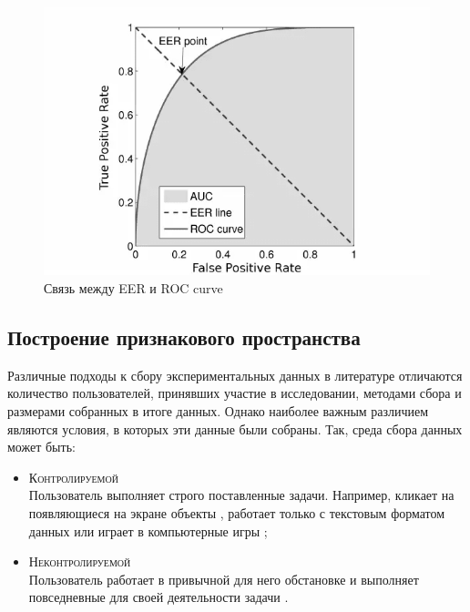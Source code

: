 \documentclass[12pt]{article}
\begin{document}
    \begin{figure}[h!]
        \centering
        \includegraphics[width=0.9\linewidth]{EER_ROC.png}
        \caption{Связь между EER и ROC curve}
        \label{sec:Overview:Metrics:fig:EER_ROC}
    \end{figure}


    \subsection{Построение признакового пространства}
    \label{sec:Overview:Features}

    \par Различные подходы к сбору экспериментальных данных в литературе отличаются количество пользователей, принявших участие в исследовании, методами сбора и размерами собранных в итоге данных. Однако наиболее важным различием являются условия, в которых эти данные были собраны. Так, среда сбора данных может быть:

     \begin{itemize}
        \item \textsc{Контролируемой} \\
        Пользователь выполняет строго поставленные задачи. Например, кликает на появляющиеся на экране объекты \cite{Stokes, Borisov, Shen, Pilankar, Monaro}, работает только с текстовым форматом данных \cite{Fridman, Masri} или играет в компьютерные игры \cite{Kasprowski};
        \item \textsc{Неконтролируемой} \\
        Пользователь работает в привычной для него обстановке и выполняет повседневные для своей деятельности задачи \cite{Mondal, Mondal_2, Mondal_3, Antal, Khalifa, Tan, Chong, Chong2D}.
    \end{itemize}
    
\end{document}
